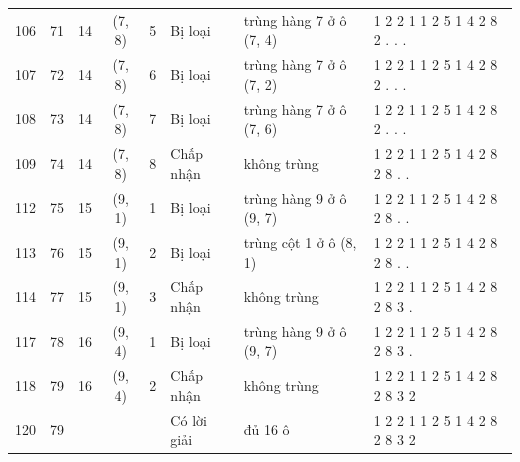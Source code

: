 \begin{longtable}{@{}rrrcc>{\raggedright\arraybackslash}p{2.1cm}>{\raggedright\arraybackslash}p{3.3cm}>{\ttfamily}l@{}}
106 & 71 & 14 & (7, 8) & 5 & Bị loại & trùng hàng 7 ở ô (7, 4) & 8 1 2 2 1 1 2 5 1 4 2 8 2 . . . \\
107 & 72 & 14 & (7, 8) & 6 & Bị loại & trùng hàng 7 ở ô (7, 2) & 8 1 2 2 1 1 2 5 1 4 2 8 2 . . . \\
108 & 73 & 14 & (7, 8) & 7 & Bị loại & trùng hàng 7 ở ô (7, 6) & 8 1 2 2 1 1 2 5 1 4 2 8 2 . . . \\
109 & 74 & 14 & (7, 8) & 8 & Chấp nhận & không trùng & 8 1 2 2 1 1 2 5 1 4 2 8 2 8 . . \\
112 & 75 & 15 & (9, 1) & 1 & Bị loại & trùng hàng 9 ở ô (9, 7) & 8 1 2 2 1 1 2 5 1 4 2 8 2 8 . . \\
113 & 76 & 15 & (9, 1) & 2 & Bị loại & trùng cột 1 ở ô (8, 1) & 8 1 2 2 1 1 2 5 1 4 2 8 2 8 . . \\
114 & 77 & 15 & (9, 1) & 3 & Chấp nhận & không trùng & 8 1 2 2 1 1 2 5 1 4 2 8 2 8 3 . \\
117 & 78 & 16 & (9, 4) & 1 & Bị loại & trùng hàng 9 ở ô (9, 7) & 8 1 2 2 1 1 2 5 1 4 2 8 2 8 3 . \\
118 & 79 & 16 & (9, 4) & 2 & Chấp nhận & không trùng & 8 1 2 2 1 1 2 5 1 4 2 8 2 8 3 2 \\
120 & 79 &  &  &  & Có lời giải & đủ 16 ô & 8 1 2 2 1 1 2 5 1 4 2 8 2 8 3 2 \\
\end{longtable}
\endgroup
